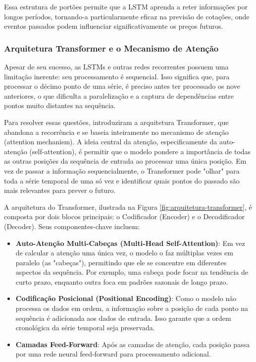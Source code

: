 Essa estrutura de portões permite que a LSTM aprenda a reter informações por longos períodos, tornando-a particularmente eficaz na previsão de cotações, onde eventos passados podem influenciar significativamente os preços futuros.

\subsubsection{Arquitetura Transformer e o Mecanismo de Atenção}

Apesar de seu sucesso, as LSTMs e outras redes recorrentes possuem uma limitação inerente: seu processamento é sequencial. Isso significa que, para processar o décimo ponto de uma série, é preciso antes ter processado os nove anteriores, o que dificulta a paralelização e a captura de dependências entre pontos muito distantes na sequência.

Para resolver essas questões, \cite{vaswani2017attention} introduziram a arquitetura Transformer, que abandona a recorrência e se baseia inteiramente no mecanismo de atenção (attention mechanism). A ideia central da atenção, especificamente da auto-atenção (self-attention), é permitir que o modelo pondere a importância de todas as outras posições da sequência de entrada ao processar uma única posição. Em vez de passar a informação sequencialmente, o Transformer pode "olhar" para toda a série temporal de uma só vez e identificar quais pontos do passado são mais relevantes para prever o futuro.

A arquitetura do Transformer, ilustrada na Figura \ref{fig:arquitetura-transformer}, é composta por dois blocos principais: o Codificador (Encoder) e o Decodificador (Decoder). Seus componentes-chave incluem:

\begin{itemize}
    \item \textbf{Auto-Atenção Multi-Cabeças (Multi-Head Self-Attention)}: Em vez de calcular a atenção uma única vez, o modelo o faz múltiplas vezes em paralelo (as "cabeças"), permitindo que ele se concentre em diferentes aspectos da sequência. Por exemplo, uma cabeça pode focar na tendência de curto prazo, enquanto outra foca em padrões sazonais de longo prazo.
    \item \textbf{Codificação Posicional (Positional Encoding)}: Como o modelo não processa os dados em ordem, a informação sobre a posição de cada ponto na sequência é adicionada aos dados de entrada. Isso garante que a ordem cronológica da série temporal seja preservada.
    \item \textbf{Camadas Feed-Forward}: Após as camadas de atenção, cada posição passa por uma rede neural feed-forward para processamento adicional.
\end{itemize}

